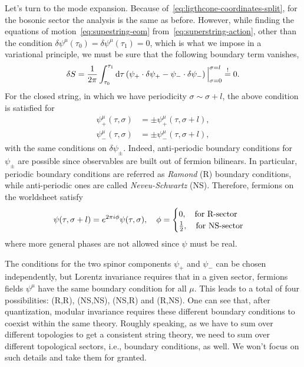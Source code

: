 Let's turn to the mode expansion. Because of~\eqref{eq:ligthcone-coordinates-split}, for the bosonic sector the analysis is the same as before. However, while finding the equations of motion~\eqref{eq:supestring-eom} from~\eqref{eq:superstring-action}, other than the condition $\delta \psi^\mu (\tau_0) = \delta \psi^\mu (\tau_1) = 0$, which is what we impose in a variational principle, we must be sure that the following boundary term vanishes,
\begin{equation}
    \delta S = \frac{1}{2\pi} \int_{\tau_0}^{\tau_1} \mathop{}\!\mathrm{d} \tau \left( \psi_+ \cdot \delta \psi_+ - \psi_- \cdot \delta \psi_- \right) \Big|_{\sigma = 0}^{\sigma = l}\overset{\mathrm{!}}{=} 0.
\end{equation}
For the closed string, in which we have periodicity $\sigma \sim \sigma + l$, the above condition is satisfied for
\begin{equation}
\begin{aligned}
    \psi^\mu_+ (\tau,\sigma) &= \pm \psi^\mu_+ (\tau,\sigma + l) ,\\
    \psi^\mu_- (\tau,\sigma) &= \pm \psi^\mu_- (\tau,\sigma + l) ,
\end{aligned}
\end{equation}
with the same conditions on $\delta \psi_\pm$. Indeed, anti-periodic boundary conditions for $\psi_\pm$ are possible since observables are built out of fermion bilinears. In particular, periodic boundary conditions are referred as \emph{Ramond} (R) boundary conditions, while anti-periodic ones are called \emph{Neveu-Schwartz} (NS). Therefore, fermions on the worldsheet satisfy
\begin{equation}
    \psi (\tau,\sigma +l) = e^{2\pi i \phi} \psi(\tau,\sigma), \quad \phi = \begin{cases}
        0, \quad \textup{for R-sector} \\ \frac{1}{2}, \quad \textup{for NS-sector}
    \end{cases}
\end{equation}
where more general phases are not allowed since $\psi$ must be real.

The conditions for the two spinor components $\psi_+$ and $\psi_-$ can be chosen independently, but Lorentz invariance requires that in a given sector, fermions fields $\psi^\mu$ have the same boundary condition for all $\mu$. This leads to a total of four possibilities: (R,R), (NS,NS), (NS,R) and (R,NS). One can see that, after quantization, modular invariance requires these different boundary conditions to coexist within the same theory. Roughly speaking, as we have to sum over different topologies to get a consistent string theory, we need to sum over different topological sectors, i.e., boundary conditions, as well. We won't focus on such details and take them for granted.

